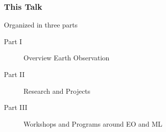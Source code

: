 \newcommand{\focusdata}{{\color{tumblue}\textbf{data}~}}
\newcommand{\focusmethod}{{\color{tumorange}\textbf{method}~}}



\begin{frame}
	\frametitle{This Talk}
	
	\Large
	
	Organized in three parts
	
	\begin{description}
		\item[Part I] Overview Earth Observation
		\item[Part II] Research and Projects
		\item[Part III] Workshops and Programs around EO and ML
	\end{description}
\end{frame}

%	






